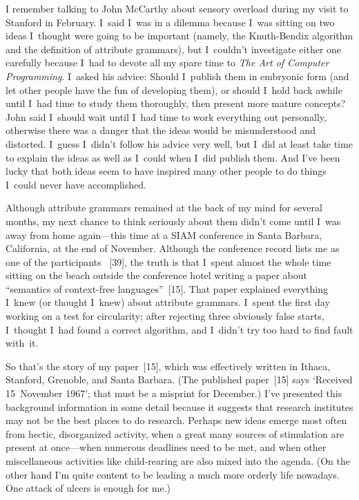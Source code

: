 I remember talking to John McCarthy about sensory overload during my
visit to Stanford in February. I~said I~was in a dilemma because I~was
sitting on two ideas I~thought were going to be important (namely, the
Knuth-Bendix algorithm and the definition of attribute grammars), but
I~couldn't investigate either one carefully because I~had to devote
all my spare time to {\sl The Art of Computer Programming}. I~asked
his advice: Should I~publish them in embryonic form (and let other
people have the fun of developing them), or should I~hold back awhile
until I~had time to study them thoroughly, then present more mature
concepts? John said I~should wait until I~had time to work everything
out personally, otherwise there was a danger that the ideas would be
misunderstood and distorted. I~guess I~didn't follow his advice very
well, but I~did at least take time to explain the ideas as well as
I~could when I~did publish them. And I've been lucky that both ideas
seem to have inspired many other people to do things I~could never
have accomplished.

Although attribute grammars remained at the back of my mind for
several months, my 
 next chance to think seriously about them didn't come
until I~was away from home again---this time at a SIAM conference in
Santa Barbara, California, at the end of November. Although the
conference record lists me as one of the participants ~[39],
the truth is that I~spent almost the whole time sitting on the beach
outside the conference hotel writing a paper about ``semantics of
context-free languages''~[15].
That paper
 explained everything I~knew (or thought I~knew) about attribute
grammars. I~spent the first day working on a test for circularity;
after rejecting three obviously false starts, I~thought I~had found a
correct algorithm, and I~didn't try too hard to find fault with~it.

So that's the story of my paper~[15],
which was effectively written in Ithaca, Stanford, Grenoble, and Santa
Barbara.  (The published paper~[15] says `Received 15~November
1967'; that must be a misprint for December.) I've presented this
background information in some detail because it suggests that
research institutes may not be the best places to do research. Perhaps
new ideas emerge most often from hectic, disorganized activity, when a
great many sources of stimulation are present at once---when numerous
deadlines need to be met, and when other miscellaneous activities like
child-rearing are also mixed into the agenda. (On the other hand I'm
quite content to be leading a much more orderly life nowadays. One
attack of ulcers is enough for me.)

